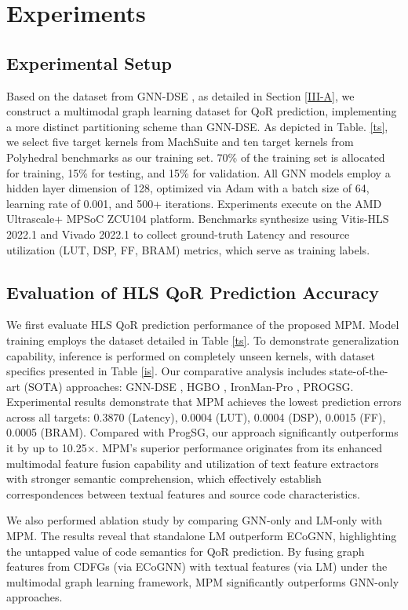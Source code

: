 \documentclass[conference]{IEEEtran}
\begin{document}
    \section{Experiments}
    \subsection{Experimental Setup}
	Based on the dataset from GNN-DSE \cite{Sohrabizadeh2022}, as detailed in Section \ref{III-A}, we construct a multimodal graph learning dataset for QoR prediction, implementing a more distinct partitioning scheme than GNN-DSE. As depicted in Table. \ref{ts}, we select five target kernels from MachSuite \cite{Reagen2014} and ten target kernels from Polyhedral benchmarks \cite{Yuki2010} as our training set. 70\% of the training set is allocated for training, 15\% for testing, and 15\% for validation. All GNN models employ a hidden layer dimension of 128, optimized via Adam with a batch size of 64, learning rate of 0.001, and 500+ iterations. Experiments execute on the AMD Ultrascale+ MPSoC ZCU104 platform. Benchmarks synthesize using Vitis-HLS 2022.1 and Vivado 2022.1 to collect ground-truth Latency and resource utilization (LUT, DSP, FF, BRAM) metrics, which serve as training labels.
	
    \subsection{Evaluation of HLS QoR Prediction Accuracy}
    We first evaluate HLS QoR prediction performance of the proposed MPM. Model training employs the dataset detailed in Table \ref{ts}. To demonstrate generalization capability, inference is performed on completely unseen kernels, with dataset specifics presented in Table \ref{is}. Our comparative analysis includes state-of-the-art (SOTA) approaches: GNN-DSE \cite{Sohrabizadeh2022}, HGBO \cite{Kuang2023}, IronMan-Pro \cite{Wu2023}, PROGSG\cite{Qin2024}. Experimental results demonstrate that MPM achieves the lowest prediction errors across all targets: 0.3870 (Latency), 0.0004 (LUT), 0.0004 (DSP), 0.0015 (FF), 0.0005 (BRAM). Compared with ProgSG, our approach significantly outperforms it by up to 10.25$\times$. MPM's superior performance originates from its enhanced multimodal feature fusion capability and utilization of text feature extractors with stronger semantic comprehension, which effectively establish correspondences between textual features and source code characteristics. 
    
    We also performed ablation study by comparing GNN-only and LM-only with MPM. The results reveal that standalone LM outperform ECoGNN, highlighting the untapped value of code semantics for QoR prediction. By fusing graph features from CDFGs (via ECoGNN) with textual features (via LM) under the multimodal graph learning framework, MPM significantly outperforms GNN-only approaches. 
	
\end{document}
